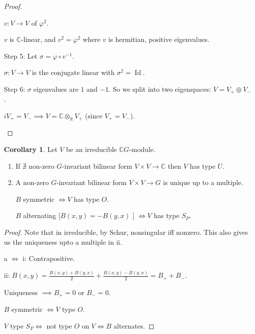 \documentclass{article}
\theoremstyle{definition}
\newtheorem{corollary}[theorem]{Corollary}
\begin{document}
\begin{proof}
\begin{enumerate}[label=\roman*)]
        \(v: V \to V\) of \(\varphi^2\).

        \(v\) is \(\mathbb{C}\)-linear, and \(v^2 = \varphi^2\) where \(v\) is hermitian, positive eigenvalues.

        Step 5: Let \(\sigma = \varphi \circ v ^{-1}\).

        \(\sigma: V \to V\) is the conjugate linear with \(\sigma^2 = \operatorname{Id}\).

        Step 6: \(\sigma\) eigenvalues are \(1\) and \(-1\). So we split into two eigenspaces: \(V = V_+ \oplus V_-\).

        \(i V_+ = V_- \implies V = \mathbb{C} \otimes_\mathbb{R} V_+\) (since \(V_+ = V_-\)).

    \end{enumerate} 
\end{proof}

\begin{corollary}
    Let \(V\) be an irreducible \(\mathbb{C} G\)-module.

    \begin{enumerate}[label=\alph*)]
        \item If \(\nexists\) non-zero \(G\)-invariant bilinear form \(V \times V \to \mathbb{C}\) then \(V\) has type \(U\).
        \item A non-zero \(G\)-invariant bilinear form \(V \times V \to G\) is unique up to a multiple.
        
        \(B\) symmetric \(\iff V\) has type \(O\).
        
        \(B\) alternating [\(B(x,y)=-B(y,x)\) ] \(\iff V\) has type \(S_P\).
    \end{enumerate} 

\end{corollary}

\begin{proof}

    Note that in irreducible, by Schur, nonsingular iff nonzero. This also gives us the uniqueness upto a multiple in ii.

    a \(\iff\) i: Contrapositive.

    ii: \(B(x,y) = \frac{B(x,y)+B(y,x)}{2} + \frac{B(x,y)-B(y,x)}{2} = B_+ + B_-\).

    Uniqueness \(\implies B_+ = 0\) or \(B_- = 0\).

    \(B\) symmetric \(\iff V\) type \(O\).

    \(V\) type \(S_P \iff\) not type \(O\) on \(V \iff B\) alternates.


\end{proof}
\end{document}
